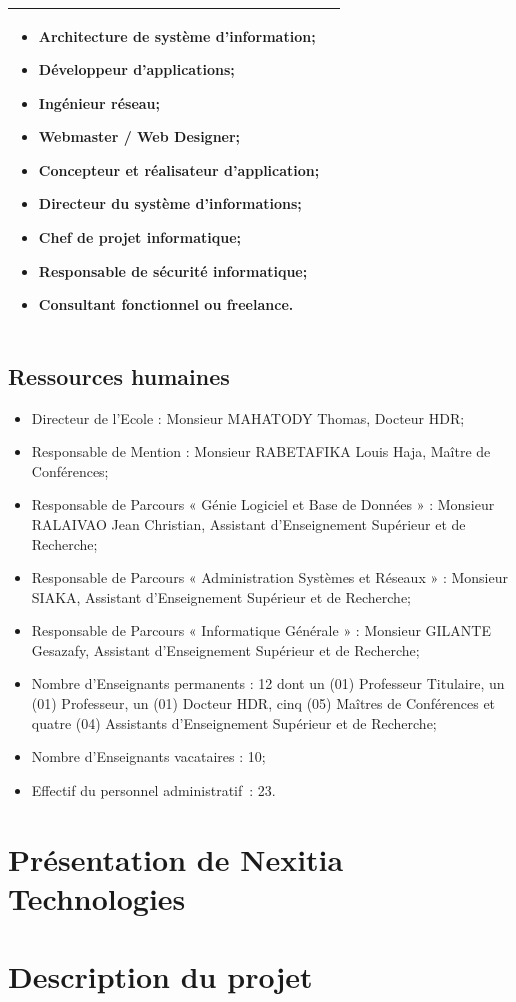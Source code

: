 \documentclass[12pt]{report}
\begin{document}
\begin{table}[h]
{\begin{tabular}{|p{5cm}|p{10cm}|}
\begin{itemize}
				        \item Architecture de système d’information;
				        \item Développeur d’applications;
				        \item Ingénieur réseau;
				        \item Webmaster / Web Designer;
				        \item Concepteur et réalisateur d’application;
				        \item Directeur du système d’informations;
				        \item Chef de projet informatique;
				        \item Responsable de sécurité informatique;
				        \item Consultant fonctionnel ou freelance.
				      \end{itemize} \\
				      \hline
				    \end{tabular}
				  }
				\end{table}
				\clearpage

				\section{Ressources humaines}
				
				\begin{itemize}
					\item Directeur de l’Ecole : Monsieur MAHATODY Thomas, Docteur HDR;
					\item Responsable de Mention : Monsieur RABETAFIKA Louis Haja, Maître de Conférences;
					\item Responsable de Parcours « Génie Logiciel et Base de Données » : Monsieur RALAIVAO Jean Christian, Assistant d’Enseignement Supérieur et de Recherche;
					\item Responsable de Parcours « Administration Systèmes et Réseaux » : Monsieur SIAKA, Assistant d’Enseignement Supérieur et de Recherche;
					\item Responsable de Parcours « Informatique Générale » : Monsieur GILANTE Gesazafy, Assistant d’Enseignement Supérieur et de Recherche;
					\item Nombre d’Enseignants permanents : 12 dont un (01) Professeur Titulaire, un (01) Professeur, un (01) Docteur HDR, cinq (05) Maîtres de Conférences et quatre (04) Assistants d’Enseignement Supérieur et de Recherche;
					\item Nombre d’Enseignants vacataires : 10;
					\item Effectif du personnel administratif : 23.
				\end{itemize}

				\chapter{Présentation de Nexitia Technologies}
				
				\chapter{Description du projet}
\end{document}
